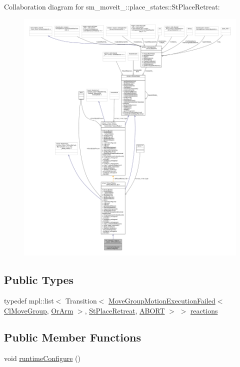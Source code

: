 Collaboration diagram for sm\+\_\+moveit\+\_\+:\+:place\+\_\+states\+:\+:St\+Place\+Retreat\+:
\nopagebreak
\begin{figure}[H]
\begin{center}
\leavevmode
\includegraphics[width=350pt]{structsm__moveit__2_1_1place__states_1_1StPlaceRetreat__coll__graph}
\end{center}
\end{figure}
\subsection*{Public Types}
\begin{DoxyCompactItemize}
\item 
typedef mpl\+::list$<$ Transition$<$ \hyperlink{structmove__group__interface__client_1_1MoveGroupMotionExecutionFailed}{Move\+Group\+Motion\+Execution\+Failed}$<$ \hyperlink{classmove__group__interface__client_1_1ClMoveGroup}{Cl\+Move\+Group}, \hyperlink{classsm__moveit__2_1_1OrArm}{Or\+Arm} $>$, \hyperlink{structsm__moveit__2_1_1place__states_1_1StPlaceRetreat}{St\+Place\+Retreat}, \hyperlink{classABORT}{A\+B\+O\+RT} $>$ $>$ \hyperlink{structsm__moveit__2_1_1place__states_1_1StPlaceRetreat_ae900e0e40af9539ce4b2c10454dde207}{reactions}
\end{DoxyCompactItemize}
\subsection*{Public Member Functions}
\begin{DoxyCompactItemize}
\item 
void \hyperlink{structsm__moveit__2_1_1place__states_1_1StPlaceRetreat_ab3c8e46bce1643ab6ecd415ecf1af6f6}{runtime\+Configure} ()
\end{DoxyCompactItemize}
